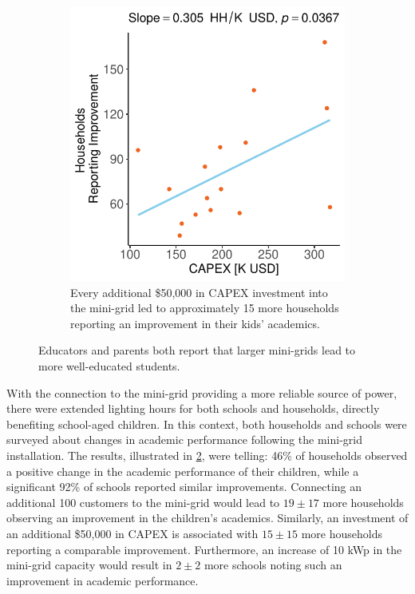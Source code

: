\begin{figure}[th]
\begin{subfigure}[t]{0.48\textwidth}
        \includegraphics[width=\textwidth]{images/school_performance_change_regression_community.pdf}
        \caption{Every additional \$50,000 in CAPEX investment into the mini-grid led to approximately 15 more households reporting an improvement in their kids' academics.}
        \label{fig:academics_households}
    \end{subfigure}
    \caption{Educators and parents both report that larger mini-grids lead to more well-educated students.}
    \label{fig:academic-performance}
\end{figure}

With the connection to the mini-grid providing a more reliable source of power, there were extended lighting hours for both schools and households, directly benefiting school-aged children. In this context, both households and schools were surveyed about changes in academic performance following the mini-grid installation. The results, illustrated in \cref{fig:academic-performance}, were telling: 46\% of households observed a positive change in the academic performance of their children, while a significant 92\% of schools reported similar improvements. Connecting an additional 100 customers to the mini-grid would lead to $19\pm17$ more households observing an improvement in the children's academics. Similarly, an investment of an additional \$50,000 in CAPEX is associated with $15\pm15$ more households reporting a comparable improvement. Furthermore, an increase of 10 kWp in the mini-grid capacity would result in $2\pm2$ more schools noting such an improvement in academic performance.

